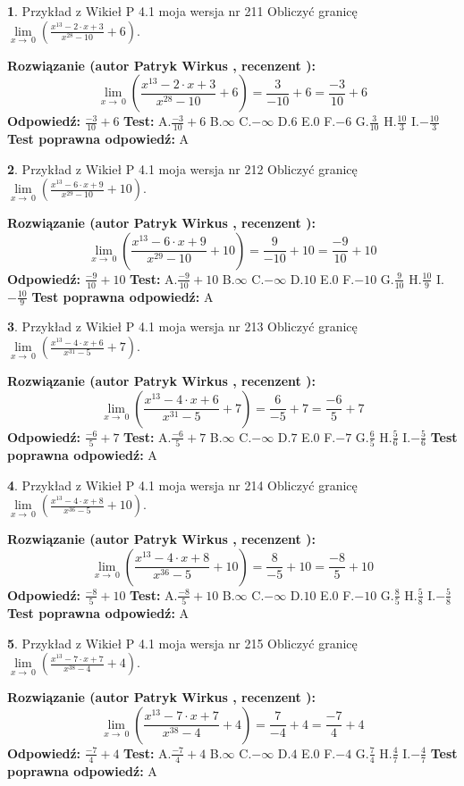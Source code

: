 \documentclass[12pt, a4paper]{article}
\theoremstyle{definition} %
\newtheorem{zad}{}
\newcommand{\zadStart}[1]{\begin{zad}#1\newline}
\newcommand{\zadStop}{\end{zad}}
\newcommand{\rozwStart}[2]{\noindent \textbf{Rozwiązanie (autor #1 , recenzent #2): }\newline}
\newcommand{\rozwStop}{\newline}
\newcommand{\odpStart}{\noindent \textbf{Odpowiedź:}\newline}
\newcommand{\odpStop}{\newline}
\newcommand{\testStart}{\noindent \textbf{Test:}\newline}
\newcommand{\testStop}{\newline}
\newcommand{\kluczStart}{\noindent \textbf{Test poprawna odpowiedź:}\newline}
\newcommand{\kluczStop}{\newline}
\begin{document}
\zadStart{Przykład z Wikieł P 4.1 moja wersja nr 211}
Obliczyć granicę $\lim\limits_{x\to\ 0}(\frac{x^{13}-2 \cdot x +3}{x^{28}-10}+6)$.
\zadStop
\rozwStart{Patryk Wirkus}{}
$$\lim\limits_{x\to\ 0}(\frac{x^{13}-2 \cdot x +3}{x^{28}-10}+6)=\frac{3}{-10}+6=\frac{-3}{10}+6$$
\rozwStop
\odpStart
$\frac{-3}{10}+6$
\odpStop
\testStart
A.$\frac{-3}{10}+6$
B.$\infty$
C.$-\infty$
D.$6$
E.$0$
F.$-6$
G.$\frac{3}{10}$
H.$\frac{10}{3}$
I.$-\frac{10}{3}$
\testStop
\kluczStart
A
\kluczStop



\zadStart{Przykład z Wikieł P 4.1 moja wersja nr 212}
Obliczyć granicę $\lim\limits_{x\to\ 0}(\frac{x^{13}-6 \cdot x +9}{x^{29}-10}+10)$.
\zadStop
\rozwStart{Patryk Wirkus}{}
$$\lim\limits_{x\to\ 0}(\frac{x^{13}-6 \cdot x +9}{x^{29}-10}+10)=\frac{9}{-10}+10=\frac{-9}{10}+10$$
\rozwStop
\odpStart
$\frac{-9}{10}+10$
\odpStop
\testStart
A.$\frac{-9}{10}+10$
B.$\infty$
C.$-\infty$
D.$10$
E.$0$
F.$-10$
G.$\frac{9}{10}$
H.$\frac{10}{9}$
I.$-\frac{10}{9}$
\testStop
\kluczStart
A
\kluczStop



\zadStart{Przykład z Wikieł P 4.1 moja wersja nr 213}
Obliczyć granicę $\lim\limits_{x\to\ 0}(\frac{x^{13}-4 \cdot x +6}{x^{31}-5}+7)$.
\zadStop
\rozwStart{Patryk Wirkus}{}
$$\lim\limits_{x\to\ 0}(\frac{x^{13}-4 \cdot x +6}{x^{31}-5}+7)=\frac{6}{-5}+7=\frac{-6}{5}+7$$
\rozwStop
\odpStart
$\frac{-6}{5}+7$
\odpStop
\testStart
A.$\frac{-6}{5}+7$
B.$\infty$
C.$-\infty$
D.$7$
E.$0$
F.$-7$
G.$\frac{6}{5}$
H.$\frac{5}{6}$
I.$-\frac{5}{6}$
\testStop
\kluczStart
A
\kluczStop



\zadStart{Przykład z Wikieł P 4.1 moja wersja nr 214}
Obliczyć granicę $\lim\limits_{x\to\ 0}(\frac{x^{13}-4 \cdot x +8}{x^{36}-5}+10)$.
\zadStop
\rozwStart{Patryk Wirkus}{}
$$\lim\limits_{x\to\ 0}(\frac{x^{13}-4 \cdot x +8}{x^{36}-5}+10)=\frac{8}{-5}+10=\frac{-8}{5}+10$$
\rozwStop
\odpStart
$\frac{-8}{5}+10$
\odpStop
\testStart
A.$\frac{-8}{5}+10$
B.$\infty$
C.$-\infty$
D.$10$
E.$0$
F.$-10$
G.$\frac{8}{5}$
H.$\frac{5}{8}$
I.$-\frac{5}{8}$
\testStop
\kluczStart
A
\kluczStop



\zadStart{Przykład z Wikieł P 4.1 moja wersja nr 215}
Obliczyć granicę $\lim\limits_{x\to\ 0}(\frac{x^{13}-7 \cdot x +7}{x^{38}-4}+4)$.
\zadStop
\rozwStart{Patryk Wirkus}{}
$$\lim\limits_{x\to\ 0}(\frac{x^{13}-7 \cdot x +7}{x^{38}-4}+4)=\frac{7}{-4}+4=\frac{-7}{4}+4$$
\rozwStop
\odpStart
$\frac{-7}{4}+4$
\odpStop
\testStart
A.$\frac{-7}{4}+4$
B.$\infty$
C.$-\infty$
D.$4$
E.$0$
F.$-4$
G.$\frac{7}{4}$
H.$\frac{4}{7}$
I.$-\frac{4}{7}$
\testStop
\kluczStart
A
\kluczStop
\end{document}
